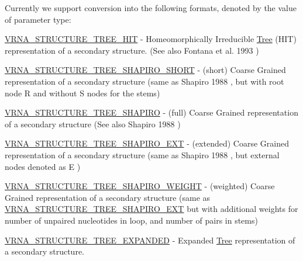 Currently we support conversion into the following formats, denoted by the value of parameter {\ttfamily type\+:} 
\begin{DoxyItemize}
\item \hyperlink{group__struct__utils__tree_ga3ad5609bc93ef20034c3ab989365c1f0}{V\+R\+N\+A\+\_\+\+S\+T\+R\+U\+C\+T\+U\+R\+E\+\_\+\+T\+R\+E\+E\+\_\+\+H\+IT} -\/ Homeomorphically Irreducible \hyperlink{structTree}{Tree} (H\+IT) representation of a secondary structure. (See also Fontana et al. 1993 \cite{fontana:1993b})
\item \hyperlink{group__struct__utils__tree_ga549e259a963d77e2d5b7e14083fc016e}{V\+R\+N\+A\+\_\+\+S\+T\+R\+U\+C\+T\+U\+R\+E\+\_\+\+T\+R\+E\+E\+\_\+\+S\+H\+A\+P\+I\+R\+O\+\_\+\+S\+H\+O\+RT} -\/ (short) Coarse Grained representation of a secondary structure (same as Shapiro 1988 \cite{shapiro:1988}, but with root node {\ttfamily R} and without {\ttfamily S} nodes for the stems)
\item \hyperlink{group__struct__utils__tree_ga4acd9991a0250ccd4cd44c4725b31927}{V\+R\+N\+A\+\_\+\+S\+T\+R\+U\+C\+T\+U\+R\+E\+\_\+\+T\+R\+E\+E\+\_\+\+S\+H\+A\+P\+I\+RO} -\/ (full) Coarse Grained representation of a secondary structure (See also Shapiro 1988 \cite{shapiro:1988})
\item \hyperlink{group__struct__utils__tree_ga8666a10982a4f7a26892066ff07b4b48}{V\+R\+N\+A\+\_\+\+S\+T\+R\+U\+C\+T\+U\+R\+E\+\_\+\+T\+R\+E\+E\+\_\+\+S\+H\+A\+P\+I\+R\+O\+\_\+\+E\+XT} -\/ (extended) Coarse Grained representation of a secondary structure (same as Shapiro 1988 \cite{shapiro:1988}, but external nodes denoted as {\ttfamily E} )
\item \hyperlink{group__struct__utils__tree_ga91f2e3a3a502d5445fd7fe5983a5fe92}{V\+R\+N\+A\+\_\+\+S\+T\+R\+U\+C\+T\+U\+R\+E\+\_\+\+T\+R\+E\+E\+\_\+\+S\+H\+A\+P\+I\+R\+O\+\_\+\+W\+E\+I\+G\+HT} -\/ (weighted) Coarse Grained representation of a secondary structure (same as \hyperlink{group__struct__utils__tree_ga8666a10982a4f7a26892066ff07b4b48}{V\+R\+N\+A\+\_\+\+S\+T\+R\+U\+C\+T\+U\+R\+E\+\_\+\+T\+R\+E\+E\+\_\+\+S\+H\+A\+P\+I\+R\+O\+\_\+\+E\+XT} but with additional weights for number of unpaired nucleotides in loop, and number of pairs in stems)
\item \hyperlink{group__struct__utils__tree_gab3b65489d1322da65d3a3e53242307ef}{V\+R\+N\+A\+\_\+\+S\+T\+R\+U\+C\+T\+U\+R\+E\+\_\+\+T\+R\+E\+E\+\_\+\+E\+X\+P\+A\+N\+D\+ED} -\/ Expanded \hyperlink{structTree}{Tree} representation of a secondary structure.
\end{DoxyItemize}


